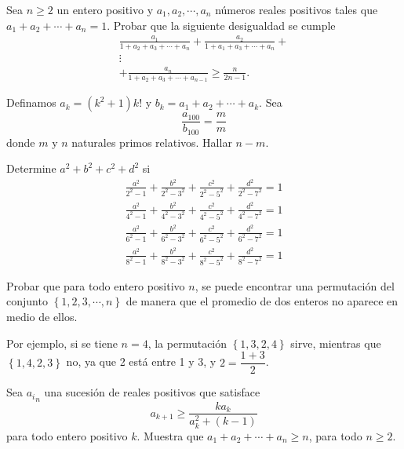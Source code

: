 \begin{section-problem}
    Sea $n\geq 2$ un entero positivo y $a_1, a_2, \cdots, a_n$ números reales positivos tales que $a_1 + a_2 + \cdots + a_n = 1$.
    Probar que la siguiente desigualdad se cumple
    \begin{gather*}
        \frac{a_1}{1 + a_2 + a_3 + \cdots + a_n} + \frac{a_2}{1 + a_1 + a_3 + \cdots + a_n} +\\
        \vdots\\
        + \frac{a_n}{1 + a_2 + a_3 + \cdots + a_{n - 1}} \geq \frac{n}{2n - 1}.
    \end{gather*}
\end{section-problem}

\begin{section-problem}
    Definamos $a_k = (k^2 + 1)k!$ y $b_k = a_1 + a_2 + \cdots + a_k$.
    Sea
    \[\frac{a_{100}}{b_{100}} = \frac{m}{m}\]
    donde $m$ y $n$ naturales primos relativos.
    Hallar $n - m.$
\end{section-problem}

\begin{section-problem}
    Determine $a^2 + b^2 + c^2 + d^2$ si
    \begin{gather*}
        \frac{a^2}{2^2 - 1} + \frac{b^2}{2^2 - 3^2} + \frac{c^2}{2^2 - 5^2} + \frac{d^2}{2^2 - 7^2} = 1\\
        \frac{a^2}{4^2 - 1} + \frac{b^2}{4^2 - 3^2} + \frac{c^2}{4^2 - 5^2} + \frac{d^2}{4^2 - 7^2} = 1\\
        \frac{a^2}{6^2 - 1} + \frac{b^2}{6^2 - 3^2} + \frac{c^2}{6^2 - 5^2} + \frac{d^2}{6^2 - 7^2} = 1\\
        \frac{a^2}{8^2 - 1} + \frac{b^2}{8^2 - 3^2} + \frac{c^2}{8^2 - 5^2} + \frac{d^2}{8^2 - 7^2} = 1
    \end{gather*}
\end{section-problem}

\begin{section-problem}
    Probar que para todo entero positivo $n$, se puede encontrar una permutación del conjunto $\left\{ 1, 2, 3 , \cdots, n \right\}$ de manera que el promedio de dos enteros no aparece en medio de ellos.
    
    Por ejemplo, si se tiene $n = 4$, la permutación $\left\{ 1, 3, 2, 4 \right\}$ sirve, mientras que $\left\{ 1, 4, 2, 3 \right\}$ no, ya que 2 está entre 1 y 3, y $2 = \dfrac{1 + 3}{2}$.
\end{section-problem}

\begin{section-problem}
    Sea ${a_i}_{n}$ una sucesión de reales positivos que satisface
    \[a_{k + 1} \geq \frac{k a_k}{a_k^2 + (k - 1)}\]
    para todo entero positivo $k$.
    Muestra que $a_1 + a_2 + \cdots + a_n \geq n$, para todo $n \geq 2$.
\end{section-problem}

